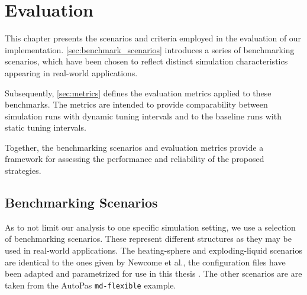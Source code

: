 \chapter[Evaluation]{Evaluation}
\label{cp:evaluation}

{
	\parindent0pt
	This chapter presents the scenarios and criteria employed in the evaluation of our implementation. \autoref{sec:benchmark_scenarios} introduces a series of benchmarking scenarios, which have been chosen to reflect distinct simulation characteristics appearing in real-world applications.

	Subsequently, \autoref{sec:metrics} defines the evaluation metrics applied to these benchmarks. The metrics are intended to provide comparability between simulation runs with dynamic tuning intervals and to the baseline runs with static tuning intervals.

	Together, the benchmarking scenarios and evaluation metrics provide a framework for assessing the performance and reliability of the proposed strategies.
}


\section{Benchmarking Scenarios}
\label{sec:benchmark_scenarios}
As to not limit our analysis to one specific simulation setting, we use a selection of benchmarking scenarios. These represent different structures as they may be used in real-world applications.
The heating-sphere and exploding-liquid scenarios are identical to the ones given by Newcome et al., the configuration files have been adapted and parametrized for use in this thesis \cite{Newcome2025}.
The other scenarios are are taken from the AutoPas \texttt{md-flexible} example. %



\newcommand{\fastcolorbar}{%
	\centering
	\begin{tikzpicture}
		\pgfplotscolorbardrawstandalone[
			colorbar,
			colormap name=fast,
			point meta min=0,
			point meta max=50,
			colorbar style={
					height=3cm,
					ytick={0,10,...,50},
					tick align=outside,
					tick pos=right,
				},
		]
	\end{tikzpicture}

	\begin{tikzpicture}
		\node[anchor=north, align=center] at (0,0) {\si{F^{*}}};
	\end{tikzpicture}
}

